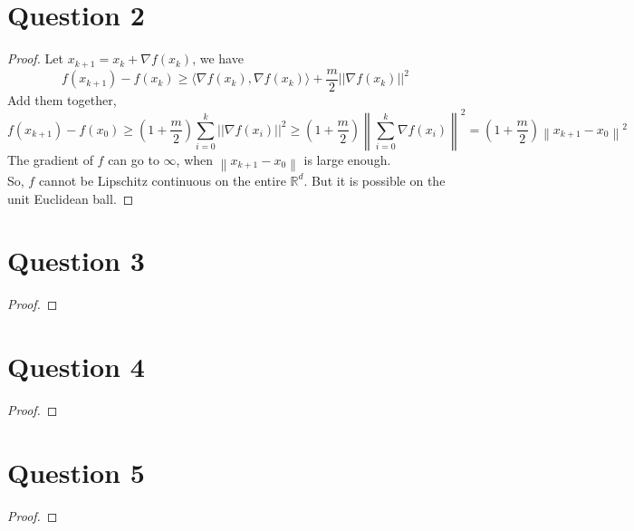 \documentclass{article}
\begin{document}
\section*{Question 2}
    \begin{proof}
    Let $x_{k+1}=x_{k}+\nabla f(x_k)$, we have
    $$f(x_{k+1})-f(x_k)\geqslant \langle \nabla f(x_k),\nabla f(x_k) \rangle + \frac{m}{2}||\nabla f(x_k)||^2$$
    Add them together,
    $$f(x_{k+1})-f(x_0) \geqslant \left(1+\frac{m}{2}\right)\sum_{i=0}^{k} ||\nabla f(x_{i})||^2 \geqslant \left(1+\frac{m}{2}\right) \left\lVert \sum_{i=0}^{k} \nabla f(x_{i})\right\rVert^2 = \left(1+\frac{m}{2}\right)\left\lVert x_{k+1}-x_0 \right \rVert^2$$
    The gradient of $f$ can go to $\infty$, when $\left\lVert x_{k+1}-x_0 \right \rVert$ is large enough.\\
    So, $f$ cannot be Lipschitz continuous on the entire $\mathbb{R}^d$.
    But it is possible on the unit Euclidean ball.
    \end{proof}


\section*{Question 3}
    \begin{proof}
        
    \end{proof}


\section*{Question 4}
    \begin{proof}
        
    \end{proof}


\section*{Question 5}
    \begin{proof}
        
    \end{proof}
\end{document}
